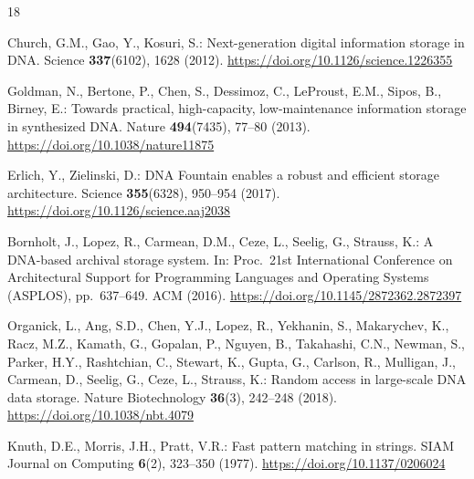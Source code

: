 \documentclass[runningheads]{llncs}
\begin{document}
\begin{thebibliography}{18}

Church, G.M., Gao, Y., Kosuri, S.: Next-generation digital information
storage in DNA. Science \textbf{337}(6102), 1628 (2012).
\url{https://doi.org/10.1126/science.1226355}

Goldman, N., Bertone, P., Chen, S., Dessimoz, C., LeProust, E.M.,
Sipos, B., Birney, E.: Towards practical, high-capacity,
low-maintenance information storage in synthesized DNA. Nature
\textbf{494}(7435), 77--80 (2013).
\url{https://doi.org/10.1038/nature11875}

Erlich, Y., Zielinski, D.: DNA Fountain enables a robust and efficient
storage architecture. Science \textbf{355}(6328), 950--954 (2017).
\url{https://doi.org/10.1126/science.aaj2038}

Bornholt, J., Lopez, R., Carmean, D.M., Ceze, L., Seelig, G.,
Strauss, K.: A DNA-based archival storage system. In: Proc.\ 21st
International Conference on Architectural Support for Programming
Languages and Operating Systems (ASPLOS), pp.~637--649. ACM (2016).
\url{https://doi.org/10.1145/2872362.2872397}

Organick, L., Ang, S.D., Chen, Y.J., Lopez, R., Yekhanin, S.,
Makarychev, K., Racz, M.Z., Kamath, G., Gopalan, P., Nguyen, B.,
Takahashi, C.N., Newman, S., Parker, H.Y., Rashtchian, C., Stewart,
K., Gupta, G., Carlson, R., Mulligan, J., Carmean, D., Seelig, G.,
Ceze, L., Strauss, K.: Random access in large-scale DNA data storage.
Nature Biotechnology \textbf{36}(3), 242--248 (2018).
\url{https://doi.org/10.1038/nbt.4079}

Knuth, D.E., Morris, J.H., Pratt, V.R.: Fast pattern matching in
strings. SIAM Journal on Computing \textbf{6}(2), 323--350 (1977).
\url{https://doi.org/10.1137/0206024}


\end{thebibliography}
\end{document}
